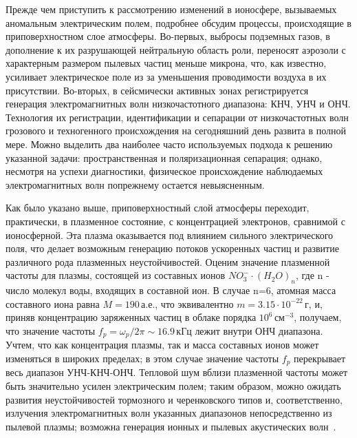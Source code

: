 \documentclass[12pt, oneside, a4paper]{article}
\begin{document}
Прежде чем приступить к рассмотрению изменений в ионосфере, вызываемых аномальным электрическим полем,  подробнее обсудим  процессы, происходящие в приповерхностном слое атмосферы. Во-первых, выбросы подземных газов, в дополнение к их разрушающей нейтральную область роли, переносят аэрозоли с характерным размером пылевых частиц меньше микрона, что, как известно, усиливает электрическое поле из за уменьшения проводимости воздуха в их присутствии. Во-вторых, в сейсмически активных зонах регистрируется генерация электромагнитных волн низкочастотного диапазона: КНЧ, УНЧ и ОНЧ.  Технология их регистрации, идентификации и сепарации от низкочастотных волн грозового и техногенного происхождения на сегодняшний день развита в полной мере. Можно выделить два наиболее часто используемых подхода к решению указанной задачи: пространственная и поляризационная сепарация; однако, несмотря на успехи диагностики, физическое происхождение наблюдаемых электромагнитных волн попрежнему остается невыясненным.

Как было указано выше, приповерхностный слой атмосферы переходит, практически, в плазменное состояние, с концентрацией электронов, сравнимой с ионосферной.  Эта плазма оказывается под влиянием сильного электрического поля, что делает возможным генерацию потоков ускоренных частиц и развитие различного рода плазменных неустойчивостей. Оценим значение плазменной частоты для плазмы, состоящей из составных ионов $NO^-_3\cdot{}(H_2O)_n$, где n - число молекул воды, входящих в составной ион. В случае n=6, атомная масса составного иона равна $M=190$\,а.е., что эквивалентно $m=3.15\cdot{}10^{-22}$\,г, и, приняв концентрацию заряженных частиц в облаке порядка $10^6$\,см$^{-3}$, получаем, что значение частоты $f_p=\omega_p/2\pi\sim{}16.9$\,кГц лежит внутри ОНЧ диапазона. Учтем, что как концентрация плазмы, так и масса составных ионов может изменяться в широких пределах; в этом случае значение частоты $f_p$ перекрывает весь диапазон УНЧ-КНЧ-ОНЧ. Тепловой шум вблизи плазменной частоты может быть значительно усилен электрическим полем; таким образом, можно ожидать развития неустойчивостей тормозного и черенковского типов и, соответственно, излучения электромагнитных волн указанных диапазонов непосредственно из пылевой плазмы; возможна генерация ионных и пылевых акустических волн~\cite{Kikuchi:2001}. 
\end{document}
